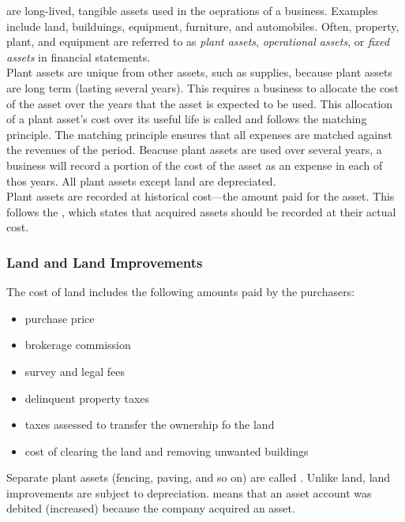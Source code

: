 \documentclass{article}
\begin{document}
 are long-lived, tangible assets used in the oeprations of a business. Examples include land, builduings, equipment, furniture, and automobiles. Often, property, plant, and equipment are referred to as \emph{plant assets}, \emph{operational assets}, or \emph{fixed assets} in financial statements. \\ 

Plant assets are unique from other assets, such as supplies, because plant assets are long term (lasting several years). This requires a business to allocate the cost of the asset over the years that the asset is expected to be used. This allocation of a plant asset's cost over its useful life is called  and follows the matching principle. The matching principle ensures that all expenses are matched against the revenues of the period. Beacuse plant assets are used over several years, a business will record a portion of the cost of the asset as an expense in each of thos years. All plant assets except land are depreciated. \\ 

Plant assets are recorded at historical cost---the amount paid for the asset. This follows the , which states that acquired assets should be recorded at their actual cost. 

\subsubsection{Land and Land Improvements}

The cost of land includes the following amounts paid by the purchasers:
\begin{itemize}
  \item purchase price 
  \item brokerage commission 
  \item survey and legal fees 
  \item delinquent property taxes 
  \item taxes assessed to transfer the ownership fo the land 
  \item cost of clearing the land and removing unwanted buildings
\end{itemize}
Separate plant assets (fencing, paving, and so on) are called . Unlike land, land improvements are subject to depreciation.  means that an asset account was debited (increased) because the company acquired an asset. \\ 
\end{document}
